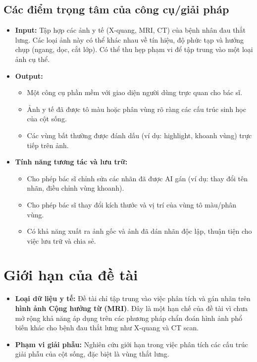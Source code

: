 \subsection*{Các điểm trọng tâm của công cụ/giải pháp}
\begin{itemize}
    \item \textbf{Input:} Tập hợp các ảnh y tế (X-quang, MRI, CT) của bệnh nhân đau thắt lưng. Các loại ảnh này có thể khác nhau về tín hiệu, độ phức tạp và hướng chụp (ngang, dọc, cắt lớp). Có thể thu hẹp phạm vi để tập trung vào một loại ảnh cụ thể.
    \item \textbf{Output:}
    \begin{itemize}
        \item[$\circ$] Một công cụ phần mềm với giao diện người dùng trực quan cho bác sĩ.
        \item[$\circ$] Ảnh y tế đã được tô màu hoặc phân vùng rõ ràng các cấu trúc sinh học của cột sống.
        \item[$\circ$] Các vùng bất thường được đánh dấu (ví dụ: highlight, khoanh vùng) trực tiếp trên ảnh.
    \end{itemize}
    \item \textbf{Tính năng tương tác và lưu trữ:}
    \begin{itemize}
        \item[$\circ$] Cho phép bác sĩ chỉnh sửa các nhãn đã được AI gán (ví dụ: thay đổi tên nhãn, điều chỉnh vùng khoanh).
        \item[$\circ$] Cho phép bác sĩ thay đổi kích thước và vị trí của vùng tô màu/phân vùng.
        \item[$\circ$] Có khả năng xuất ra ảnh gốc và ảnh đã dán nhãn độc lập, thuận tiện cho việc lưu trữ và chia sẻ.
    \end{itemize}
\end{itemize}

\section{Giới hạn của đề tài}
\begin{itemize}
    \item \textbf{Loại dữ liệu y tế:} Đề tài chỉ tập trung vào việc phân tích và gán nhãn trên \textbf{hình ảnh Cộng hưởng từ (MRI)}. Đây là một hạn chế của đề tài vì chưa mở rộng khả năng áp dụng trên các phương pháp chẩn đoán hình ảnh phổ biến khác cho bệnh đau thắt lưng như X-quang và CT scan.
    \item \textbf{Phạm vi giải phẫu:} Nghiên cứu giới hạn trong việc phân tích các cấu trúc giải phẫu của cột sống, đặc biệt là vùng thắt lưng.
\end{itemize}

